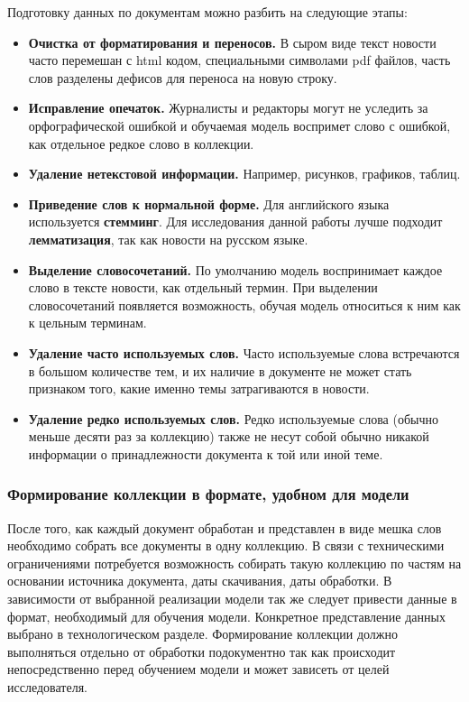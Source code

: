 Подготовку данных по документам можно разбить на следующие этапы:

\begin{itemize}
    \item\textbf{Очистка от форматирования и переносов.} В сыром виде текст новости часто перемешан с html кодом, специальными символами pdf файлов, часть слов разделены дефисов для переноса на новую строку.
    \item\textbf{Исправление опечаток.} Журналисты и редакторы могут не уследить за орфографической ошибкой и обучаемая модель воспримет слово с ошибкой, как отдельное редкое слово в коллекции.
    \item\textbf{Удаление нетекстовой информации.} Например, рисунков, графиков, таблиц.
    \item\textbf{Приведение слов к нормальной форме.} Для английского языка используется \textbf{стемминг}. Для исследования данной работы лучше подходит \textbf{лемматизация}, так как новости на русском языке.
    \item\textbf{Выделение словосочетаний.} По умолчанию модель воспринимает каждое слово в тексте новости, как отдельный термин. При выделении словосочетаний появляется возможность, обучая модель относиться к ним как к цельным терминам.
    \item\textbf{Удаление часто используемых слов.} Часто используемые слова встречаются в большом количестве тем, и их наличие в документе не может стать признаком того, какие именно темы затрагиваются в новости. 
    \item\textbf{Удаление редко используемых слов.} Редко используемые слова (обычно меньше десяти раз за коллекцию) также не несут собой обычно никакой информации о принадлежности документа к той или иной теме.
\end{itemize}

%
\subsubsection{Формирование коллекции в формате, удобном для модели}

После того, как каждый документ обработан и представлен в виде мешка слов необходимо собрать все документы в одну коллекцию. В связи с техническими ограничениями потребуется возможность собирать такую коллекцию по частям на основании источника документа, даты скачивания, даты обработки. В зависимости от выбранной реализации модели так же следует привести данные в формат, необходимый для обучения модели. Конкретное представление данных выбрано в технологическом разделе. Формирование коллекции должно выполняться отдельно от обработки подокументно так как происходит непосредственно перед обучением модели и может зависеть от целей исследователя.

